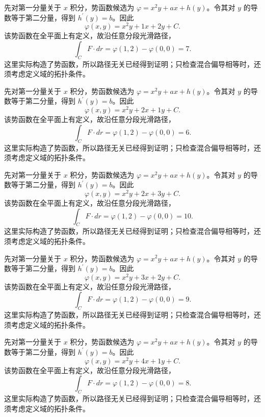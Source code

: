 \documentclass[UTF8,12pt,a4paper,fontset=fandol]{ctexart}
\begin{document}
\begin{solve}\label{ans:c41q14}
先对第一分量关于 $x$ 积分，势函数候选为 $\varphi=x^2y+ax+h(y)$。令其对 $y$ 的导数等于第二分量，得到 $h^{\prime}(y)=b$。因此
\[
\varphi(x,y)=x^2y+1x+2y+C.
\]
该势函数在全平面上有定义，故沿任意分段光滑路径，
\[
\int_C F\cdot dr=\varphi(1,2)-\varphi(0,0)=7.
\]
这里实际构造了势函数，所以路径无关已经得到证明；只检查混合偏导相等时，还须考虑定义域的拓扑条件。
\end{solve}

\begin{solve}\label{ans:c41q15}
先对第一分量关于 $x$ 积分，势函数候选为 $\varphi=x^2y+ax+h(y)$。令其对 $y$ 的导数等于第二分量，得到 $h^{\prime}(y)=b$。因此
\[
\varphi(x,y)=x^2y+2x+1y+C.
\]
该势函数在全平面上有定义，故沿任意分段光滑路径，
\[
\int_C F\cdot dr=\varphi(1,2)-\varphi(0,0)=6.
\]
这里实际构造了势函数，所以路径无关已经得到证明；只检查混合偏导相等时，还须考虑定义域的拓扑条件。
\end{solve}

\begin{solve}\label{ans:c41q16}
先对第一分量关于 $x$ 积分，势函数候选为 $\varphi=x^2y+ax+h(y)$。令其对 $y$ 的导数等于第二分量，得到 $h^{\prime}(y)=b$。因此
\[
\varphi(x,y)=x^2y+2x+3y+C.
\]
该势函数在全平面上有定义，故沿任意分段光滑路径，
\[
\int_C F\cdot dr=\varphi(1,2)-\varphi(0,0)=10.
\]
这里实际构造了势函数，所以路径无关已经得到证明；只检查混合偏导相等时，还须考虑定义域的拓扑条件。
\end{solve}

\begin{solve}\label{ans:c41q17}
先对第一分量关于 $x$ 积分，势函数候选为 $\varphi=x^2y+ax+h(y)$。令其对 $y$ 的导数等于第二分量，得到 $h^{\prime}(y)=b$。因此
\[
\varphi(x,y)=x^2y+3x+2y+C.
\]
该势函数在全平面上有定义，故沿任意分段光滑路径，
\[
\int_C F\cdot dr=\varphi(1,2)-\varphi(0,0)=9.
\]
这里实际构造了势函数，所以路径无关已经得到证明；只检查混合偏导相等时，还须考虑定义域的拓扑条件。
\end{solve}

\begin{solve}\label{ans:c41q18}
先对第一分量关于 $x$ 积分，势函数候选为 $\varphi=x^2y+ax+h(y)$。令其对 $y$ 的导数等于第二分量，得到 $h^{\prime}(y)=b$。因此
\[
\varphi(x,y)=x^2y+4x+1y+C.
\]
该势函数在全平面上有定义，故沿任意分段光滑路径，
\[
\int_C F\cdot dr=\varphi(1,2)-\varphi(0,0)=8.
\]
这里实际构造了势函数，所以路径无关已经得到证明；只检查混合偏导相等时，还须考虑定义域的拓扑条件。
\end{solve}
\end{document}

